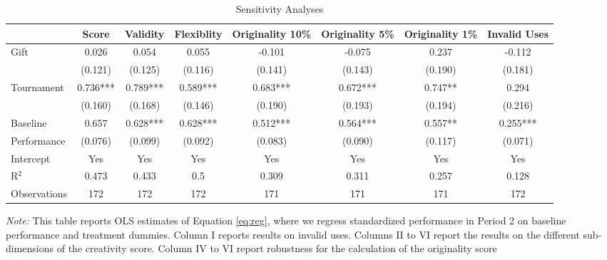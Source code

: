 \begin{landscape}
\begin{table}\caption{Sensitivity Analyses}
\begin{center}%
{\small\renewcommand{\arraystretch}{0.8}%
{\setlength{\tabcolsep}{7pt}
\begin{tabular}{l*{7}{c}}
\toprule
                    &\multicolumn{1}{c}{Score}&\multicolumn{1}{c}{Validity}&\multicolumn{1}{c}{Flexiblity}&\multicolumn{1}{c}{Originality 10\%}&\multicolumn{1}{c}{Originality 5\%}&\multicolumn{1}{c}{Originality 1\%} & \multicolumn{1}{c}{Invalid Uses}\\
\midrule
Gift                		&	0.026	&		      0.054         		&		      0.055         		&		      -0.101         		&		     -0.075         		&		       0.237			&		      -0.112         			\\
                    		&	(0.121)	&		      (0.125)         		&		      (0.116)         		&		     (0.141)         		&		     (0.143)         		&		      (0.190)	&		     (0.181)         			\\\addlinespace
Tournament             		&	0.736***	&		       0.789***		&		       0.589***		&		       0.683***		&		       0.672***		&		       0.747**	&		       0.294         			\\
                    		&	(0.160)	&		      (0.168)         		&		      (0.146)         		&		      (0.190)         		&		      (0.193)         		&		      (0.194)		&		      (0.216)         			\\\addlinespace
Baseline		&	0.657	&		       0.628***		&		       0.628***		&		       0.512***		&		       0.564***		&		       0.557**		&		       0.255***			\\
Performance		&	(0.076)	&		      (0.099)         		&		      (0.092)         		&		      (0.083)         		&		      (0.090)         		&		      (0.117)		&		      (0.071)         			\\
\midrule																
Intercept 	&	  Yes 	&	  Yes 	&	  Yes 	&	  Yes 	&	  Yes 	&	  Yes	&	 Yes 		 \\\midrule
R$^2$ 	&	0.473	&	0.433	&	0.5	&	0.309	&	0.311	&	0.257	&	0.128		\\
Observations        	&	172	&	172	&	172	&	171	&	171	&	171	&	172		\\
\bottomrule
\end{tabular}}
\begin{minipage}{0.75\linewidth}
\footnotesize
\vspace{5mm}
{\it Note:} This table reports OLS estimates of Equation \ref{eq:reg}, where we regress standardized performance in Period 2 on baseline performance and treatment dummies. Column I reports results on invalid uses. Columns II to VI report the results on the different sub-dimensions of the creativity score. Column IV to VI report robustness for the calculation of the originality score 

\end{minipage}}
\end{center}
\end{table}
\end{landscape}
